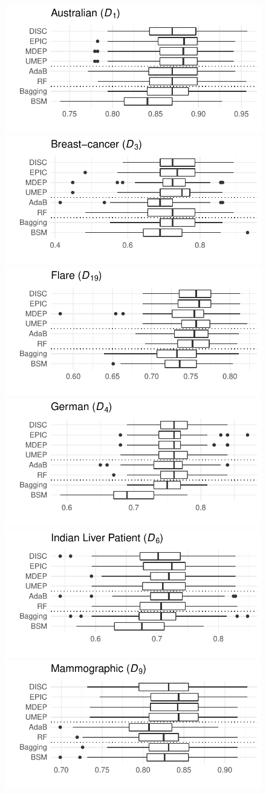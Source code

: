 \begin{figure}[!ht]
\begin{center}\scriptsize
  \includegraphics[width=.49\textwidth]{6_analysis/fig/boxplot-Australian.pdf}
  \includegraphics[width=.49\textwidth]{6_analysis/fig/boxplot-Breast-cancer.pdf} \\
  \includegraphics[width=.49\textwidth]{6_analysis/fig/boxplot-Flare.pdf}
  \includegraphics[width=.49\textwidth]{6_analysis/fig/boxplot-German.pdf}\\
  \includegraphics[width=.49\textwidth]{6_analysis/fig/boxplot-Indian Liver Patient.pdf}
  \includegraphics[width=.49\textwidth]{6_analysis/fig/boxplot-Mammographic.pdf}\\

\end{center}
\end{figure}
